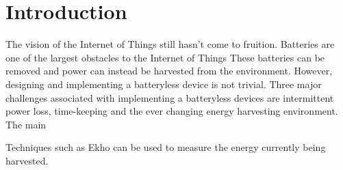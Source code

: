 \section{Introduction} %
\label{sec:introduction}

The vision of the Internet of Things still hasn't come to fruition.
Batteries are one of the largest obstacles to the Internet of Things \cite{intermittentAndAwesome}
These batteries can be removed and power can instead be harvested from the environment.
However, designing and implementing a batteryless device is not trivial.
Three major challenges associated with implementing a batteryless devices are intermittent power loss, time-keeping and the ever changing energy harvesting environment.
The main

Techniques such as Ekho \cite{ekho} can be used to measure the energy currently being harvested.
